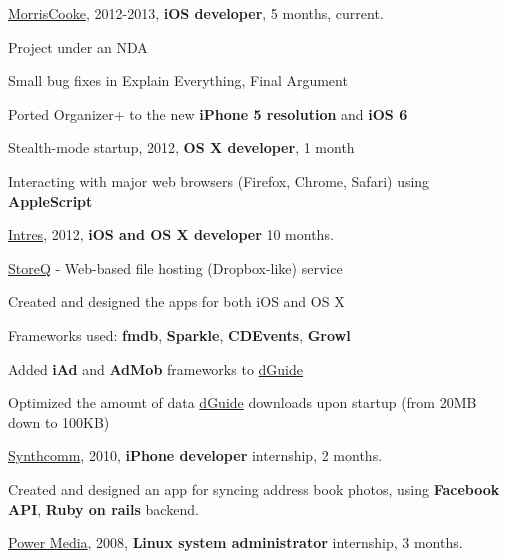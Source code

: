 \documentclass[letterpaper]{article}
\renewenvironment{itemize}{
  \begin{list}{}{
    \setlength{\leftmargin}{1.5em}
  }
}{
  \end{list}
}
\begin{document}
\begin{itemize}
    \item \href{http://www.morriscooke.com}{MorrisCooke}, 2012-2013, {\bf iOS developer}, 5 months, current.
		\begin{itemize}
            \item Project under an NDA
            \item Small bug fixes in Explain Everything, Final Argument
            \item Ported Organizer+ to the new {\bf iPhone 5 resolution} and {\bf iOS 6}
		\end{itemize}

	\item Stealth-mode startup, 2012, {\bf OS X developer}, 1 month
		\begin{itemize}
			\item Interacting with major web browsers (Firefox, Chrome, Safari) using {\bf AppleScript}
		\end{itemize}

    \item \href{http://intres.com.pl}{Intres}, 2012, {\bf iOS and OS X developer} 10 months.
		\begin{itemize}

            \item \href{http://storeq.com}{StoreQ} - Web-based file hosting (Dropbox-like) service
                \begin{itemize}
                    \item Created and designed the apps for both iOS and OS X
                    \item Frameworks used: {\bf fmdb}, {\bf Sparkle}, {\bf CDEvents}, {\bf Growl}
                \end{itemize}

            \item Added {\bf iAd} and {\bf AdMob} frameworks to \href{http://dguide.pl}{dGuide}

            \item Optimized the amount of data \href{http://dguide.pl}{dGuide} downloads upon startup (from 20MB down to 100KB)\\

        \end{itemize}

    \item \href{http://www.linkedin.com/company/synthcomm-sp.-z-o.o.}{Synthcomm}, 2010, {\bf iPhone developer} internship, 2 months.
		\begin{itemize}

			\item Created and designed an app for syncing address book photos,
                using {\bf Facebook API}, {\bf Ruby on rails} backend.

		\end{itemize}

    \item \href{http://power.com.pl}{Power Media}, 2008, {\bf Linux system administrator} internship, 3 months.
\end{itemize}
\end{document}
